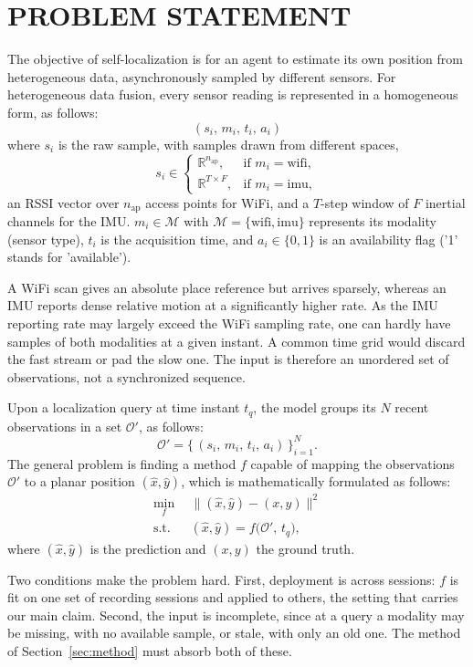 \section{\uppercase{Problem Statement}}\label{sec:problem}

\noindent
The objective of self-localization is for an agent to estimate its own position from heterogeneous data, asynchronously sampled by different sensors. For heterogeneous data fusion, every sensor reading is represented in a homogeneous form, as follows:
\[(s_i,\, m_i,\, t_i,\, a_i)\]
where $s_i$ is the raw sample, with samples
drawn from different spaces,
\begin{equation}\label{eq:spaces}
  s_i \in
  \begin{cases}
    \mathbb{R}^{n_{\mathrm{ap}}}, & \text{if~} m_i=\text{wifi},\\[2pt]
    \mathbb{R}^{T\times F},      & \text{if~} m_i=\text{imu},
  \end{cases}
\end{equation}
an RSSI vector over $n_{\mathrm{ap}}$ access points for WiFi, and a $T$-step
window of $F$ inertial channels for the IMU. $m_i \in \mathcal{M}$ with $\mathcal{M}=\{\text{wifi},\text{imu}\}$ represents its modality
(sensor type), $t_i$ is the acquisition time, and $a_i \in \{0,1\}$ is an availability flag ('1' stands for 'available'). 

A WiFi scan gives an absolute place reference but arrives sparsely, whereas
an IMU reports dense relative motion at a significantly higher rate. As the IMU reporting rate may largely exceed the WiFi sampling rate, one can hardly have samples of both modalities at a given instant. A common time grid would discard the fast stream or pad the slow
one. The input is therefore an unordered set of observations, not a
synchronized sequence.

Upon a localization query at time instant $t_q$, the model groups its $N$ recent observations in a set $\mathcal{O}'$, as follows:
\begin{equation}\label{eq:obsset-gen}
  \mathcal{O}' = \big\{\, (s_i,\, m_i,\, t_i,\, a_i) \,\big\}_{i=1}^{N}.
\end{equation}
The general problem is finding a method $f$ capable of mapping the observations $\mathcal{O}'$ to a planar position $(\hat{x},\hat{y})$, which is mathematically formulated as follows:
\begin{equation}\label{eq:objective-gen}
  \begin{aligned}
    \min_{f}\ \ & \big\lVert (\hat{x},\hat{y}) - (x,y) \big\rVert^2 \\
    \text{s.t.}\ \ & (\hat{x},\hat{y}) = f\big(\mathcal{O}',\, t_q\big),
  \end{aligned}
\end{equation}
where $(\hat{x},\hat{y})$ is the prediction and $(x,y)$ the ground truth.

Two conditions make the problem hard. First, deployment is across sessions:
$f$ is fit on one set of recording sessions and applied to others, the
setting that carries our main claim. Second, the input is incomplete, since
at a query a modality may be missing, with no available sample, or stale,
with only an old one. The method of Section~\ref{sec:method} must absorb
both of these.
